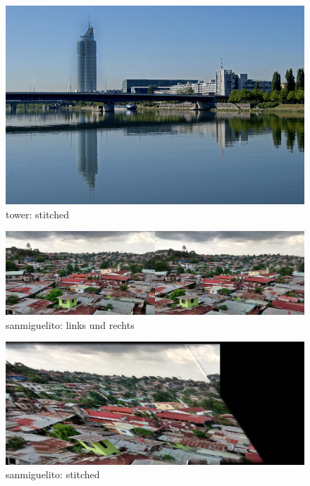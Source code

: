\documentclass[deutsch]{scrartcl}
\begin{document}
\begin{figure}
\begin{center}
\includegraphics[width=1.0\textwidth]{towerS.png}
\caption{tower: stitched}
\label{fig:towerS}
\end{center}
\end{figure}

\begin{figure}
\begin{center}
\includegraphics[width=1.0\textwidth]{sanmiguelito.jpg}
\caption{sanmiguelito: links und rechts}
\label{fig:sanmiguelito}
\end{center}
\end{figure}

\begin{figure}
\begin{center}
\includegraphics[width=1.0\textwidth]{sanmiguelitoS.png}
\caption{sanmiguelito: stitched}
\label{fig:sanmiguelitoS}
\end{center}
\end{figure}
\end{document}
